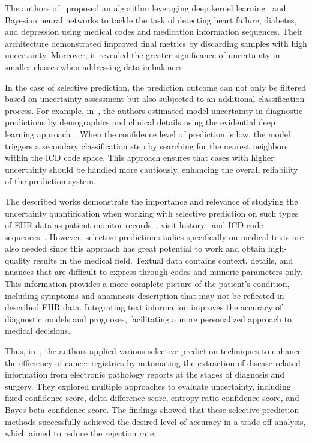   The authors of~\cite{li2020deep} proposed an algorithm leveraging deep kernel learning~\cite{pmlr-v51-wilson16} and Bayesian neural networks to tackle the task of detecting heart failure, diabetes, and depression using medical codes and medication information sequences. Their architecture demonstrated improved final metrics by discarding samples with high uncertainty. Moreover, it revealed the greater significance of uncertainty in smaller classes when addressing data imbalances.

  In the case of selective prediction, the prediction outcome can not only be filtered based on uncertainty assessment but also subjected to an additional classification process. For example, in~\cite{ASHFAQ2023104019}, the authors estimated model uncertainty in diagnostic predictions by demographics and clinical details using the evidential deep learning approach~\cite{sensoy2018evidential}. When the confidence level of prediction is low, the model triggers a secondary classification step by searching for the nearest neighbors within the ICD code space. This approach ensures that cases with higher uncertainty should be handled more cautiously, enhancing the overall reliability of the prediction system.

  The described works demonstrate the importance and relevance of studying the uncertainty quantification when working with selective prediction on such types of EHR data as patient monitor records~\cite{heo2018uncertaintyaware, qiu2019modeling}, visit history~\cite{ASHFAQ2023104019} and ICD code sequences~\cite{li2020deep}. However, selective prediction studies specifically on medical texts are also needed since this approach has great potential to work and obtain high-quality results in the medical field. Textual data contains context, details, and nuances that are difficult to express through codes and numeric parameters only. This information provides a more complete picture of the patient's condition, including symptoms and anamnesis description that may not be reflected in described EHR data. Integrating text information improves the accuracy of diagnostic models and prognoses, facilitating a more personalized approach to medical decisions.

  Thus, in~\cite{PELUSO2024104576}, the authors applied various selective prediction techniques to enhance the efficiency of cancer registries by automating the extraction of disease-related information from electronic pathology reports at the stages of diagnosis and surgery. They explored multiple approaches to evaluate uncertainty, including fixed confidence score, delta difference score, entropy ratio confidence score, and Bayes beta confidence score. The findings showed that these selective prediction methods successfully achieved the desired level of accuracy in a trade-off analysis, which aimed to reduce the rejection rate.

